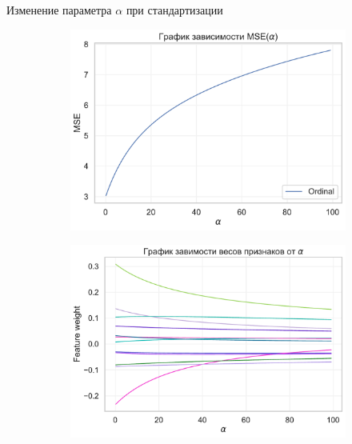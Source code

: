 \documentclass{beamer} %
\begin{document}
\begin{frame}{Изменение параметра $\alpha$ при стандартизации}
\begin{figure}
\begin{subfigure}[b]{0.475\textwidth}
                \includegraphics[width=\textwidth]{MSE_plot_scaled_1.pdf}
            \end{subfigure}
            \hfill
            \begin{subfigure}[b]{0.475\textwidth}   
                \centering 
                \includegraphics[width=\textwidth]{feature_plot_scaled_1.pdf}
            \end{subfigure} 
        \end{figure}
    \end{frame}
\end{document}
